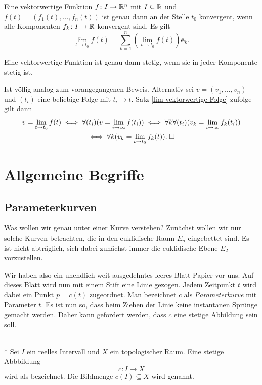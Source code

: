 \begin{theorem}\label{lim-vektorwertige-Funktion}
Eine vektorwertige Funktion $f\colon I\to\mathbb R^n$ mit $I\subseteq\mathbb R$ und
$f(t)=(f_1(t),\ldots,f_n(t))$ ist genau dann an der Stelle $t_0$
konvergent, wenn alle Komponenten $f_k\colon I\to\mathbb R$
konvergent sind. Es gilt%
\begin{equation}
\lim_{t\to t_0} f(t) = \sum_{k=1}^n (\lim_{t\to t_0}f(t))\mathbf e_k.
\end{equation}
\end{theorem}
\begin{corollary}
Eine vektorwertige Funktion ist genau dann stetig, wenn sie in
jeder Komponente stetig ist.
\end{corollary}
 Ist völlig analog zum vorangegangenen Beweis.
Alternativ sei $v=(v_1,\ldots,v_n)$ und $(t_i)$ eine beliebige Folge
mit $t_i\to t$. Satz \ref{lim-vektorwertige-Folge} zufolge gilt dann
\begin{gather}
v = \lim_{t\to t_0} f(t) \iff \forall (t_i)(v=\lim_{i\to\infty} f(t_i))
\iff \forall k\forall(t_i)(v_k = \lim_{i\to\infty} f_k(t_i))\\
\iff \forall k(v_k = \lim_{t\to t_0} f_k(t)).\;\Box
\end{gather}


\section{Allgemeine Begriffe}
\subsection{Parameterkurven}

Was wollen wir genau unter einer Kurve verstehen? Zunächst wollen
wir nur solche Kurven betrachten, die in den euklidische Raum $E_n$
eingebettet sind. Es ist nicht abträglich, sich dabei zunächst immer
die euklidische Ebene $E_2$ vorzustellen.

Wir haben also ein unendlich weit ausgedehntes leeres Blatt Papier
vor uns. Auf dieses Blatt wird nun mit einem Stift eine Linie gezogen.
Jedem Zeitpunkt $t$ wird dabei ein Punkt $p=c(t)$ zugeordnet.
Man bezeichnet $c$ als \emph{Parameterkurve} mit Parameter $t$.
Es ist nun so, dass beim Ziehen der Linie keine instantanen Sprünge
gemacht werden. Daher kann gefordert werden, dass $c$ eine
stetige Abbildung sein soll.

\begin{definition}\mbox{}\\*
Sei $I$ ein reelles Intervall und $X$ ein topologischer Raum.
Eine stetige Abbbildung%
\begin{equation}
c\colon I\to X
\end{equation}
wird als  bezeichnet. Die Bildmenge
$c(I)\subseteq X$ wird  genannt.
\end{definition}

